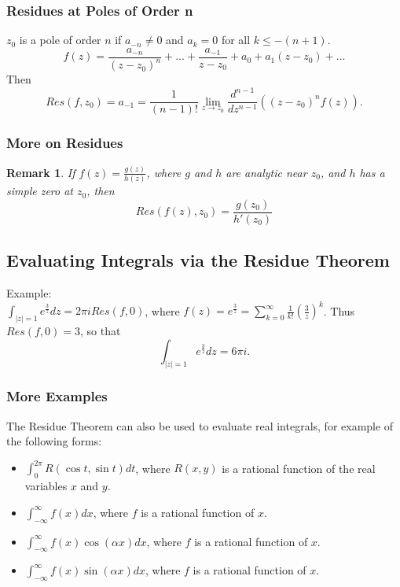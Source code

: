 \documentclass{article}
\newtheorem*{remark}{Remark}
\begin{document}
\subsubsection{Residues at Poles of Order n}
$z_0$ is a pole of order $n$ if $a_{-n} \neq 0$ and $a_k = 0$ for all $k \leq -(n+1)$.
\begin{equation*}
f(z) = \frac{a_{-n}}{(z-z_0)^n} + ... + \frac{a_{-1}}{z-z_0} + a_0 + a_1(z-z_0) + ...
\end{equation*}
Then
\begin{equation*}
Res(f,z_0) = a_{-1} = \frac{1}{(n-1)!} \lim_{z \to z_0} \frac{d^{n-1}}{dz^{n-1}}((z-z_0)^nf(z)).
\end{equation*}

\subsubsection{More on Residues}
\begin{remark}
If $f(z) = \frac{g(z)}{h(z)}$, where $g$ and $h$ are analytic near $z_0$, and $h$ has a simple zero at $z_0$, then
\begin{equation*}
Res(f(z),z_0) = \frac{g(z_0)}{h'(z_0)}
\end{equation*}
\end{remark}

\subsection{Evaluating Integrals via the Residue Theorem}
Example: \\
$\int_{\left|z\right| = 1} e^{\frac{3}{z}}dz = 2\pi i Res(f,0)$, where $f(z) = e^{\frac{3}{z}} = \sum_{k=0}^{\infty} \frac{1}{k!}(\frac{3}{z})^k$. Thus $Res(f,0) = 3$, so that
\begin{equation*}
\int_{\left|z\right| = 1} e^{\frac{3}{z}}dz = 6\pi i.
\end{equation*}

\subsubsection{More Examples}
The Residue Theorem can also be used to evaluate real integrals, for example of the following forms:
\begin{itemize}
\item $\int_0^{2\pi} R(\cos t, \sin t) dt$, where $R(x,y)$ is a rational function of the real variables $x$ and $y$.
\item $\int_{-\infty}^{\infty}f(x)dx$, where $f$ is a rational function of $x$.
\item $\int_{-\infty}^{\infty}f(x)\cos (\alpha x)dx$, where $f$ is a rational function of $x$.
\item $\int_{-\infty}^{\infty}f(x)\sin (\alpha x)dx$, where $f$ is a rational function of $x$.
\end{itemize}
\end{document}
